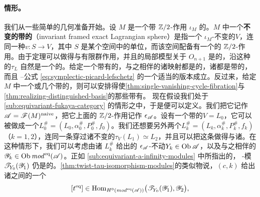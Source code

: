 \paragraph{\trEquivariant{}情形。}\label{sub:equivariant-case}
我们从一些简单的几何准备开始。设 $M$ 是一个带 $\mathbb{Z}/2$-作用 $\iota_M$ 的\trExactSymplectic\trManifold。$M$ 中一个\textbf{不变的带\trFrame{}的\trExact\trLagrange\trSphere}（invariant framed exact Lagrangian sphere）是指一个 $\iota_M$-不变的\trExact\trLagrange\trSubmanifold{}$V$，连同一种\trEquivariant\trDiffeomorphism{}$v\colon S\to V$，其中 $S$ 是某个\trInnerProduct{}空间中的单位\trSphere，而该空间配备有一个\trLinear{}的 $\mathbb{Z}/2$-作用。由于\trLagrange\trTubularNeighborhood{}定理可以做得与有限群作用\trCompatible，并且\trDehnTwist{}的局部模型关于 $O_{n+1}$ 是\trEquivariant{}的，沿这种\trSphere{}的\trDehnTwist{}$\tau_L$ 自然是一个\trEquivariant{}的\trExactSymplectic\trAutomorphism。给定一个带有\trFibrewise\trInvolution{}的\trExact\trLefschetzFibration，与之相伴的诸\trParallelTransport{}映射都是\trEquivariant{}的，诸\trVanishingCycle{}都是\trEquivariant{}带\trFrame{}的\trSphere，而且 \trPicard--\trLefschetz{}公式 \eqref{eq:symplectic-picard-lefschetz} 的一个适当的\trEquivariant{}版本成立。反过来，给定 $M$ 中一个或几个\trEquivariant{}带\trFrame{}的\trSphere，则可以安排得使\cref{thm:single-vanishing-cycle-fibration}与\cref{thm:realizing-distinguished-basis}的那些\trLefschetzFibration{}带有\trFibrewise\trInvolution。
现在假设我们处于 \cref{sub:equivariant-fukaya-category} 的情形之中，于是\trEquivariant\trFukayaCategory{}便可以定义。我们把它记作 $\mathscr{A}=\mathscr{F}(M)^{\mathrm{naive}}$，把它上面的 $\mathbb{Z}/2$-作用记作 $\epsilon_{\mathscr{A}}$。设有一个\trEquivariant{}带\trFrame{}的\trExact\trLagrange\trSphere{}$V=L_0$，它可以被做成一个\trEquivariant\trBrane{}$L^{\#}_0=(L_0,\alpha^{\#}_0,P^{\#}_0,f_0)$。我们还想要另外两个\trEquivariant\trBrane{}$L^{\#}_k=(L_k,\alpha^{\#}_k,P^{\#}_k,f_k)$（$k=1,2$），连同一条穿过诸不变\trExact\trLagrange\trSubmanifold{}的\trIsotopy{}$\tau_V(L_1)\simeq L_2$，并且可以把这条\trIsotopy{}做得与诸\trEquivariant\trBraneStructure\trCompatible。在这种情形下，我们可以考虑由诸 $L^{\#}_k$ 给出的 $\epsilon_{\mathscr{A}}$-不动\trObject{}$Y_k\in\operatorname{Ob}\mathscr{A}$，以及与之相伴的\trEquivariant{}\trYoneda{}\trModule{}$\mathscr{Y}_k\in\operatorname{Ob}\mathit{mod}^{\mathrm{eq}}(\mathscr{A})$。正如 \cref{sub:equivariant-a-infinity-modules} 中所指出的，\trTwisted{} \trAinfty-模 $\mathscr{T}_{Y_0}(\mathscr{Y}_1)$ 仍是\trEquivariant{}的。\cref{thm:twist-tau-isomorphism-modules}的\trEquivariant{}类似物说，$(c,k)$ 给出诸\trEquivariant{}\trModule{}之间的一个\trMorphism
\begin{equation}\label{eq:equivariant-module-morphism-teq}
[t^{\mathrm{eq}}]\in\operatorname{Hom}_{H^0(\mathit{mod}^{\mathrm{eq}}(\mathscr{A}))}\bigl(\mathscr{T}_{Y_0}(\mathscr{Y}_1),\mathscr{Y}_2\bigr),
\end{equation}
